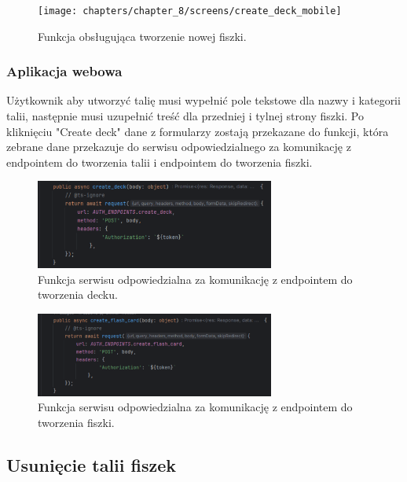 \begin{figure}[H]
    \centering
    \texttt{[image: chapters/chapter\_8/screens/create\_deck\_mobile]}
    \caption{Funkcja obsługująca tworzenie nowej fiszki.}
    \label{img:create_deck_mobile}
\end{figure}

\subsubsection{Aplikacja webowa}

Użytkownik aby utworzyć talię musi wypełnić pole tekstowe dla nazwy i kategorii talii, następnie musi uzupełnić treść dla przedniej i tylnej strony fiszki. Po kliknięciu "Create deck" dane z formularzy zostają przekazane do funkcji, która zebrane dane przekazuje do serwisu odpowiedzialnego za komunikację z endpointem do tworzenia talii i endpointem do tworzenia fiszki.

\begin{figure}[H]
    \centering
    \includegraphics[width=0.7\textwidth]{chapters/chapter_8/screens/create_deck_web}
    \caption{Funkcja serwisu odpowiedzialna za komunikację z endpointem do tworzenia decku.}
    \label{img:create_deck_web}
\end{figure}

\begin{figure}[H]
    \centering
    \includegraphics[width=0.7\textwidth]{chapters/chapter_8/screens/create_flash_card_web}
    \caption{Funkcja serwisu odpowiedzialna za komunikację z endpointem do tworzenia fiszki.}
    \label{img:create_flash_card_web}
\end{figure}

\subsection{Usunięcie talii fiszek}

